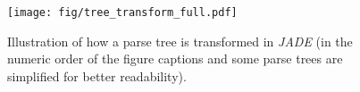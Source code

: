 \begin{figure}[t]
\centering
\texttt{[image: fig/tree\_transform\_full.pdf]}
        \caption{Illustration of how a parse tree is transformed in \textit{JADE} {\footnotesize (in the numeric order of the figure captions and some parse trees are simplified for better readability)}.}
        \label{fig:method:transformational_example}
\end{figure}



